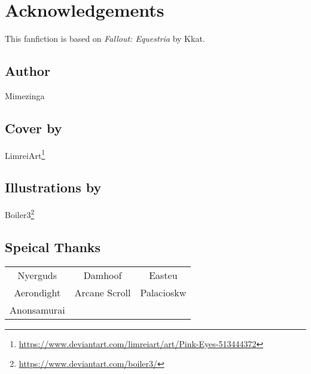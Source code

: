 \chapter{Acknowledgements}


\pagestyle{english}

\begin{english}

\begin{center}
    This fanfiction is based on \emph{Fallout: Equestria} by Kkat.    
\end{center}

\section*{Author}

\begin{center}
    Mimezinga
\end{center}

\section*{Cover by}

\begin{center}
    LimreiArt\footnote{\url{https://www.deviantart.com/limreiart/art/Pink-Eyes-513444372}}
\end{center}

\section*{Illustrations by}

\begin{center}
    Boiler3\footnote{\url{https://www.deviantart.com/boiler3/}}
\end{center}

\section*{Speical Thanks}

\begin{table}[H]
    \centering
    \begin{tabular}{ccc}
        Nyerguds & Damhoof & Easteu \\
        Aerondight & Arcane Scroll & Palacioskw \\
        Anonsamurai & & \\
    \end{tabular}
\end{table}


\end{english}
